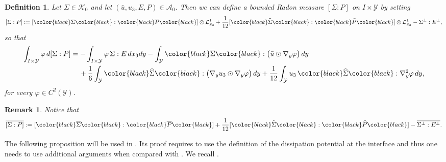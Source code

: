 \documentclass[reqno,10pt]{amsart}
\numberwithin{equation}{section}
\newtheorem{definition}[theorem]{Definition}
\newtheorem{remark}[theorem]{Remark}
\theoremstyle{remark}
\newcommand{\RED}{\color{black}}
\newcommand{\BLACK}{\color{black}}
\newcommand{\PINK}{\color{black}}
\newcommand{\calA}{\mathcal{A}}
\newcommand{\calK}{\mathcal{K}}
\newcommand{\calL}{\mathcal{L}}
\newcommand{\M}{\mathbb{M}}
\newcommand{\calY}{\mathcal{Y}}
\DeclareMathOperator{\sym}{sym}
\newcommand{\zerothI}[1]{\overline{#1}}
\newcommand{\firstI}[1]{\widehat{#1}}
\newcommand{\Mb}{\mathcal{M}_b}
\newcommand{\D}{\nabla}
\begin{document}
\begin{definition}
Let 
$\Sigma \in \calK_{0}$
and let 
$(\bar{u}, u_3, E, P) \in \calA_{0}$. 
Then we can define a bounded Radon measure $[ \Sigma : P ]$ on $I \times \calY$ by setting
\begin{equation*}
	[ \Sigma : P ] := 
	[ {\PINK\zerothI{\Sigma}\BLACK} : {\PINK\zerothI{P}\BLACK} ] \otimes \calL^{1}_{x_3} 
	+ \frac{1}{12} [ {\PINK\firstI{\Sigma}\BLACK} : {\PINK\firstI{P}\BLACK} ] \otimes \calL^{1}_{x_3} 
	- \Sigma^\perp : E^\perp,
\end{equation*}
so that
\begin{align} \label{cell stress-strain duality - regime zero}
\begin{split}
	\int_{I \times \calY} \varphi \,d[ \Sigma : P ] 
	& = - \int_{I \times \calY} \varphi\,\Sigma : E \,dx_3 dy 
	- \int_{\calY} {\PINK\zerothI{\Sigma}\BLACK} : \big( \bar{u} \odot \nabla_{y}\varphi \big) \,dy\\
	& \,\quad + \frac{1}{6} \int_{\calY} {\PINK\firstI{\Sigma}\BLACK} : \big( \nabla_{y}u_3 \odot \nabla_{y}\varphi \big) \,dy 
	+ \frac{1}{12} \int_{\calY} u_3\,{\PINK\firstI{\Sigma}\BLACK} : {\D}^2_{y}\varphi \,dy,
\end{split}
\end{align}
for every $\varphi \in C^2(\calY)$.
\end{definition}

\begin{remark} \label{remmarin1} 
Notice that 
\[
	\zerothI{[ \Sigma : P ]} := 
	[ {\PINK\zerothI{\Sigma}\BLACK} : {\PINK\zerothI{P}\BLACK} ] 
	+ \frac{1}{12} [ {\PINK\firstI{\Sigma}\BLACK} : {\PINK\firstI{P}\BLACK} ] 
	- \zerothI{\Sigma^\perp : E^\perp}.
\]
\end{remark}

The following proposition will be used in . 
Its proof requires to use the definition of the dissipation potential at the interface and thus one needs to use additional arguments when compared with \cite{Buzancic.Davoli.Velcic.2024.2nd}. We recall .
\end{document}
